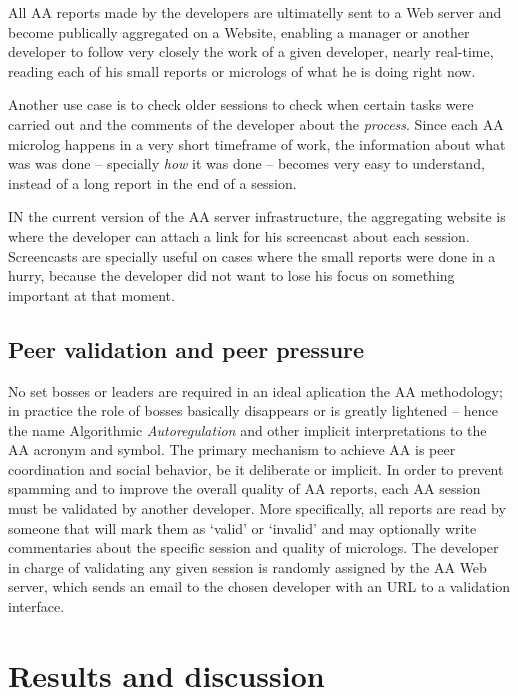 \documentclass{article}
\begin{document}
All AA reports made by the developers are ultimatelly sent to a Web server and
become publically aggregated on a Website, enabling a manager or another
developer to follow very closely the work of a given developer, nearly real-time,
reading each of his small reports or micrologs of what he is doing right now.

Another use case is to check older sessions to check when certain tasks
were carried out and the comments of the developer about the \emph{process}.
Since each AA microlog happens in a very short timeframe of work, the information
about what was was done -- specially \emph{how} it was done -- becomes very easy to
understand, instead of a long report in the end of a session.

IN the current version of the AA server infrastructure, the aggregating
website is where the developer can attach a link for his
screencast about each session. Screencasts are specially useful on cases where
the small reports were done in a hurry, because the developer did not want to
lose his focus on something important at that moment.

\subsection{Peer validation and peer pressure}

No set bosses or leaders are required in an ideal aplication the AA methodology;
in practice the role of bosses basically disappears or is greatly lightened --
hence the name Algorithmic \emph{Autoregulation} and other implicit
interpretations to the AA acronym and symbol. The primary mechanism to achieve
AA is peer coordination and social behavior, be it deliberate or implicit. In
order to prevent spamming and to improve the overall quality of AA reports, each
AA session must be validated by another developer. More specifically, all
reports are read by someone that will mark them as `valid' or `invalid' and may
optionally write commentaries about the specific session and quality of
micrologs. The developer in charge of validating any given session is randomly
assigned by the AA Web server, which sends an email to the chosen developer with
an URL to a validation interface. 


\section{Results and discussion}
\label{results}
\end{document}
